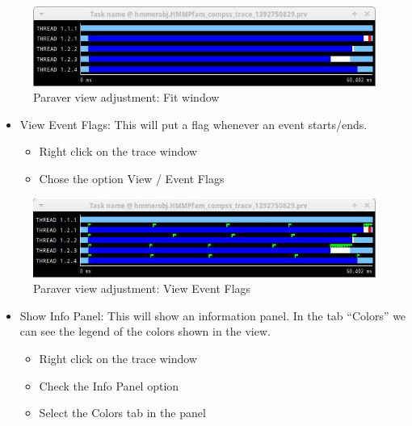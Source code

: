 \begin{figure}[ht!]
  \centering
    \includegraphics[width=1.0\textwidth]{./Sections/4_Tools/Figures/3.jpeg}
    \caption{Paraver view adjustment: Fit window}
\end{figure}

\begin{itemize} 
 \item View Event Flags: This will put a flag whenever an event starts/ends.
	\begin{itemize}
	    \item Right click on the trace window
	    \item Chose the option View / Event Flags
	\end{itemize}
\end{itemize}
 
\begin{figure}[ht!]
  \centering
    \includegraphics[width=1.0\textwidth]{./Sections/4_Tools/Figures/4.jpeg}
    \caption{Paraver view adjustment: View Event Flags}
\end{figure}

\begin{itemize}
 \item Show Info Panel: This will show an information panel. In the tab ``Colors'' we can see the legend of the colors shown in the view.
	\begin{itemize}
	    \item Right click on the trace window
	    \item Check the Info Panel option
	    \item Select the Colors tab in the panel
	\end{itemize}
\end{itemize}

